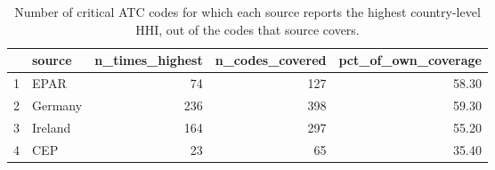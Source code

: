 \begin{table}[ht]
\centering
\begin{tabular}{rlrrr}
  \hline
 & source & n\_times\_highest & n\_codes\_covered & pct\_of\_own\_coverage \\ 
  \hline
1 & EPAR &  74 & 127 & 58.30 \\ 
  2 & Germany & 236 & 398 & 59.30 \\ 
  3 & Ireland & 164 & 297 & 55.20 \\ 
  4 & CEP &  23 &  65 & 35.40 \\ 
   \hline
\end{tabular}
\caption{Number of critical ATC codes for which each source reports the highest country-level HHI, out of the codes that source covers.} 
\label{tab:hhi_highest_by_sourceT}
\end{table}
